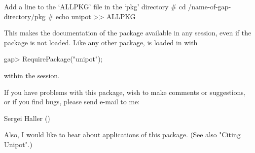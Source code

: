 Add a line to the `ALLPKG' file in the `pkg' directory
\begintt
# cd /name-of-gap-directory/pkg
# echo unipot >> ALLPKG
\endtt

This makes the  documentation  of the package  available  in any  {}
session,  even  if the  package  is not loaded. Like  any other  package,
{\Unipot} is loaded in {\GAP} with

\beginexample
gap> RequirePackage("unipot");
\endexample

within the {} session.

If you have problems with this package, wish to make comments
or suggestions, or if you find bugs, please send e-mail to me:

Sergei Haller ()

Also, I would like to hear about applications of this package.
(See also "Citing Unipot".)




